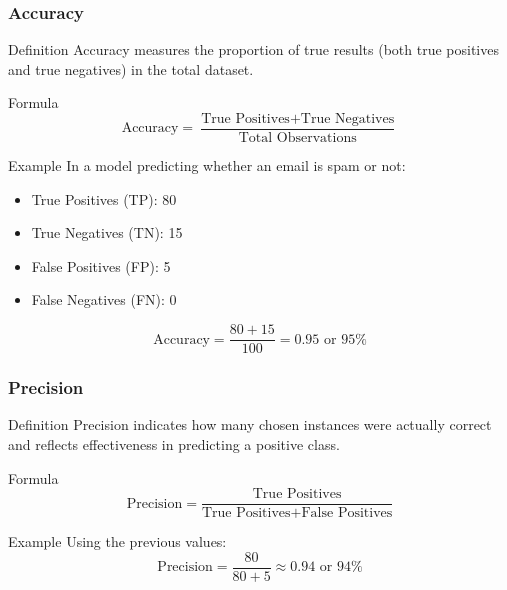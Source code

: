 \documentclass[aspectratio=169]{beamer}
\begin{document}
\begin{frame}[fragile]
    \frametitle{Accuracy}
    \begin{block}{Definition}
        Accuracy measures the proportion of true results (both true positives and true negatives) in the total dataset.
    \end{block}
    \begin{block}{Formula}
        \begin{equation}
        \text{Accuracy} = \frac{\text{True Positives} + \text{True Negatives}}{\text{Total Observations}}
        \end{equation}
    \end{block}
    \begin{block}{Example}
        In a model predicting whether an email is spam or not:
        \begin{itemize}
            \item True Positives (TP): 80
            \item True Negatives (TN): 15
            \item False Positives (FP): 5
            \item False Negatives (FN): 0
        \end{itemize}
        \begin{equation}
        \text{Accuracy} = \frac{80 + 15}{100} = 0.95 \text{ or } 95\%
        \end{equation}
    \end{block}
\end{frame}

\begin{frame}[fragile]
    \frametitle{Precision}
    \begin{block}{Definition}
        Precision indicates how many chosen instances were actually correct and reflects effectiveness in predicting a positive class.
    \end{block}
    \begin{block}{Formula}
        \begin{equation}
        \text{Precision} = \frac{\text{True Positives}}{\text{True Positives} + \text{False Positives}}
        \end{equation}
    \end{block}
    \begin{block}{Example}
        Using the previous values: 
        \begin{equation}
        \text{Precision} = \frac{80}{80 + 5} \approx 0.94 \text{ or } 94\%
        \end{equation}
    \end{block}
\end{frame}
\end{document}
